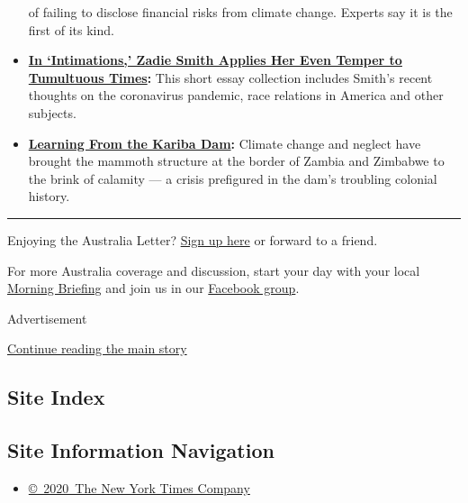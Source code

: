 \begin{itemize}
  of failing to disclose financial risks from climate change. Experts
  say it is the first of its kind.
\item
  \textbf{\href{https://www.nytimes.com/2020/07/22/books/review-intimations-essays-zadie-smith.html}{In
  `Intimations,' Zadie Smith Applies Her Even Temper to Tumultuous
  Times}:} This short essay collection includes Smith's recent thoughts
  on the coronavirus pandemic, race relations in America and other
  subjects.
\item
  \textbf{\href{https://www.nytimes.com/interactive/2020/07/22/magazine/zambia-kariba-dam.html}{Learning
  From the Kariba Dam}:} Climate change and neglect have brought the
  mammoth structure at the border of Zambia and Zimbabwe to the brink of
  calamity --- a crisis prefigured in the dam's troubling colonial
  history.
\end{itemize}

\begin{center}\rule{0.5\linewidth}{\linethickness}\end{center}

Enjoying the Australia Letter?
\href{https://www.nytimes.com/newsletters/australia-letter?utm_source=ausend}{Sign
up here} or forward to a friend.

For more Australia coverage and discussion, start your day with your
local
\href{https://www.nytimes.com/interactive/2018/briefing/global-morning-briefing-newsletter-signup.html?utm_source=ausend}{Morning
Briefing} and join us in our
\href{https://www.facebook.com/groups/nytaustralia/}{Facebook group}.

Advertisement

\protect\hyperlink{after-bottom}{Continue reading the main story}

\hypertarget{site-index}{%
\subsection{Site Index}\label{site-index}}

\hypertarget{site-information-navigation}{%
\subsection{Site Information
Navigation}\label{site-information-navigation}}

\begin{itemize}
\tightlist
\item
  \href{https://help.nytimes.com/hc/en-us/articles/115014792127-Copyright-notice}{©~2020~The
  New York Times Company}
\end{itemize}

